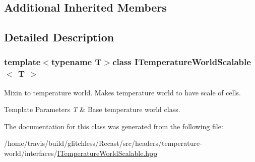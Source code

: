 \subsection*{Additional Inherited Members}


\subsection{Detailed Description}
\subsubsection*{template$<$typename T$>$class I\-Temperature\-World\-Scalable$<$ T $>$}

Mixin to temperature world. Makes temperature world to have scale of cells.


\begin{DoxyTemplParams}{Template Parameters}
{\em T} & Base temperature world class. \\
\hline
\end{DoxyTemplParams}


The documentation for this class was generated from the following file\-:\begin{DoxyCompactItemize}
\item 
/home/travis/build/glitchless/\-Recast/src/headers/temperature-\/world/interfaces/\hyperlink{_i_temperature_world_scalable_8hpp}{I\-Temperature\-World\-Scalable.\-hpp}\end{DoxyCompactItemize}
